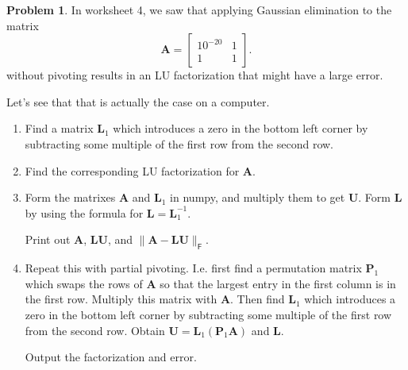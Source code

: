 \documentclass[12pt]{article}
\theoremstyle{definition}
\newtheorem{problem}{Problem}
\renewcommand{\vec}{\mathbf}
\newcommand{\F}{\mathsf{F}}
\begin{document}
\begin{problem}
    In worksheet 4, we saw that applying Gaussian elimination to the matrix
    \[
        \vec{A} = 
    \begin{bmatrix}
        10^{-20} & 1 \\ 1 & 1 
    \end{bmatrix}.
    \]
    without pivoting results in an LU factorization that might have a large error.

    Let's see that that is actually the case on a computer.

    \begin{enumerate}
        \item Find a matrix $\vec{L}_1$ which introduces a zero in the bottom left corner by subtracting some multiple of the first row from the second row.
        \item Find the corresponding LU factorization for $\vec{A}$.
        \item Form the matrixes $\vec{A}$ and $\vec{L}_1$ in numpy, and multiply them to get $\vec{U}$. 
        Form $\vec{L}$ by using the formula for $\vec{L} = \vec{L}_1^{-1}$.

        Print out $\vec{A}$, $\vec{L}\vec{U}$, and $\|\vec{A}-\vec{L}\vec{U}\|_\F$. 

        \item Repeat this with partial pivoting. I.e. first find a permutation matrix $\vec{P}_1$ which swaps the rows of $\vec{A}$ so that the largest entry in the first column is in the first row. Multiply this matrix with $\vec{A}$. 
        Then find $\vec{L}_1$ which introduces a zero in the bottom left corner by subtracting some multiple of the first row from the second row.
        Obtain $\vec{U} =\vec{L}_1 (\vec{P}_1\vec{A})$ and $\vec{L}$.

        Output the factorization and error.

    \end{enumerate}




\end{problem}
\end{document}
